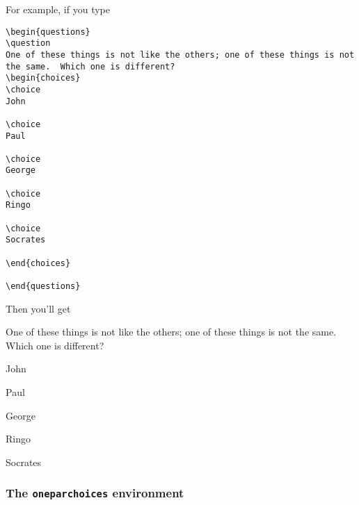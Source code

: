 \documentclass[12pt]{exam}
\begin{document}
For example, if you type
\begin{verbatim}
\begin{questions}
\question
One of these things is not like the others; one of these things is not
the same.  Which one is different?
\begin{choices}
\choice
John

\choice
Paul

\choice
George

\choice
Ringo

\choice
Socrates

\end{choices}
    
\end{questions}
\end{verbatim}
Then you'll get
\begin{questions}
\question
One of these things is not like the others; one of these things is not
the same.  Which one is different?
\begin{choices}
\choice
John

\choice
Paul

\choice
George

\choice
Ringo

\choice
Socrates

\end{choices}
    
\end{questions}

\subsubsection{The \texttt{oneparchoices} environment}
\end{document}
